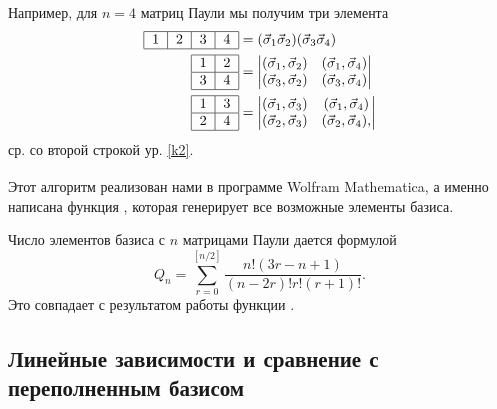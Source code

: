 \documentclass[]{article}
\renewcommand{\[}{\begin{equation}}
\renewcommand{\]}{\end{equation}}
\begin{document}
Например, для $n=4$ матриц Паули мы получим три элемента
\begin{align}
\begin{tabular}{ |l|l|l|l| }
\hline
1 & 2 & 3 & 4 \\
\hline
\end{tabular} & = ({\vec \sigma}_1{\vec\sigma}_2)({\vec \sigma}_3{\vec\sigma}_4) \nonumber
\\
%	
\begin{tabular}{ |l|l| }
\hline
1 & 2 \\ \hline
3 & 4 \\
\hline
\end{tabular} &
=\begin{vmatrix}
(\vec\sigma_1,\vec\sigma_2) & (\vec\sigma_1,\vec\sigma_4)\\
(\vec\sigma_3,\vec\sigma_2) & (\vec\sigma_3,\vec\sigma_4)\\
\end{vmatrix} \nonumber
\\
%
\begin{tabular}{ |l|l| }
\hline
1 & 3 \\ \hline
2 & 4 \\
\hline
\end{tabular} &
=\begin{vmatrix}
(\vec\sigma_1,\vec\sigma_3) & (\vec\sigma_1,\vec\sigma_4)\\
(\vec\sigma_2,\vec\sigma_3) & (\vec\sigma_2,\vec\sigma_4),\\
\end{vmatrix}
\label{example4}
\end{align}
ср. со второй строкой ур. \eqref{k2}.


Этот алгоритм реализован нами в программе Wolfram Mathematica\textsuperscript{\textcopyright}, а именно  написана функция  \cite{basis_gen_code}, которая генерирует все возможные элементы базиса.

Число элементов базиса с $n$ матрицами Паули дается формулой \cite{sourceArticle}
\[
Q_n = \sum_{r=0}^{[n/2]}\frac{n!(3r-n+1)}{(n-2r)!r!(r+1)!}.
\label{k9}
\]
Это совпадает с результатом работы функции \cite{basis_gen_code}.


\subsection{Линейные зависимости и сравнение с переполненным базисом}
\end{document}
